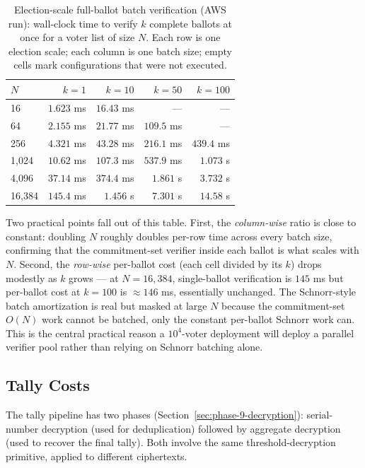 \documentclass[12pt,a4paper,oneside]{report}
\begin{document}
\begin{table}[H]
\centering
\caption{Election-scale full-ballot batch verification (AWS run):
wall-clock time to verify $k$ complete ballots at once for a voter
list of size $N$. Each row is one election scale; each column is one
batch size; empty cells mark configurations that were not executed.}
\label{tab:bench-election-batch}
\small
\begin{tabular}{lrrrr}
\toprule
$N$ & $k = 1$ & $k = 10$ & $k = 50$ & $k = 100$ \\
\midrule
16       & $1.623$ ms & $16.43$ ms & ---        & ---        \\
64       & $2.155$ ms & $21.77$ ms & $109.5$ ms & ---        \\
256      & $4.321$ ms & $43.28$ ms & $216.1$ ms & $439.4$ ms \\
1{,}024  & $10.62$ ms & $107.3$ ms & $537.9$ ms & $1.073$ s  \\
4{,}096  & $37.14$ ms & $374.4$ ms & $1.861$ s  & $3.732$ s  \\
16{,}384 & $145.4$ ms & $1.456$ s  & $7.301$ s  & $14.58$ s  \\
\bottomrule
\end{tabular}
\end{table}

Two practical points fall out of this table. First, the
\emph{column-wise} ratio is close to constant: doubling $N$ roughly
doubles per-row time across every batch size, confirming that the
commitment-set verifier inside each ballot is what scales with $N$.
Second, the \emph{row-wise} per-ballot cost (each cell divided by its
$k$) drops modestly as $k$ grows --- at $N = 16{,}384$, single-ballot
verification is $145$ ms but per-ballot cost at $k = 100$ is
$\approx 146$ ms, essentially unchanged. The Schnorr-style batch
amortization is real but masked at large $N$ because the
commitment-set $O(N)$ work cannot be batched, only the constant
per-ballot Schnorr work can. This is the central practical reason a
$10^4$-voter deployment will deploy a parallel verifier pool rather
than relying on Schnorr batching alone.

\subsection{Tally Costs}
\label{sec:bench-tally}

The tally pipeline has two phases (Section~\ref{sec:phase-9-decryption}): 
serial-number decryption (used for deduplication) followed by aggregate 
decryption (used to recover the final tally). Both involve the same 
threshold-decryption primitive, applied to different ciphertexts.
\end{document}
